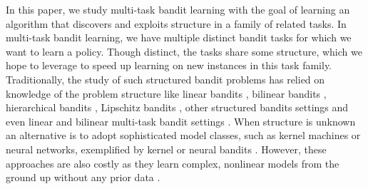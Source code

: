 
In this paper, we study multi-task bandit learning with the goal of learning an algorithm that discovers and exploits structure in a family of related tasks.
% 
In multi-task bandit learning, we have multiple distinct bandit tasks for which we want to learn a policy. Though distinct, the tasks share some structure, which we hope to leverage to speed up learning on new instances in this task family.
% 
Traditionally, the study of such structured bandit problems has relied on knowledge of the problem structure like linear bandits \citep{li2010contextual, abbasi2011improved, degenne2020gamification}, bilinear bandits \citep{jun2019bilinear}, hierarchical bandits \citep{hong2022deep, hong2022hierarchical}, Lipschitz bandits \citep{bubeck2008online, bubeck2011lipschitz, magureanu2014lipschitz},  other structured bandits settings \citep{riquelme2018deep, lattimore2019information, dong2021provable} and even linear and bilinear multi-task bandit settings \citep{yang2022nearly, du2023multi, mukherjee2023multi}.
% 
When structure is unknown an alternative is to adopt sophisticated model classes, such as kernel machines or neural networks, exemplified by kernel or neural bandits \citep{valko2013finite, chowdhury2017kernelized, zhou2020neural, dai2022federated}. However, these approaches are also costly as they learn complex, nonlinear models from the ground up without any prior data \citep{justus2018predicting, zambaldi2018relational}. 


